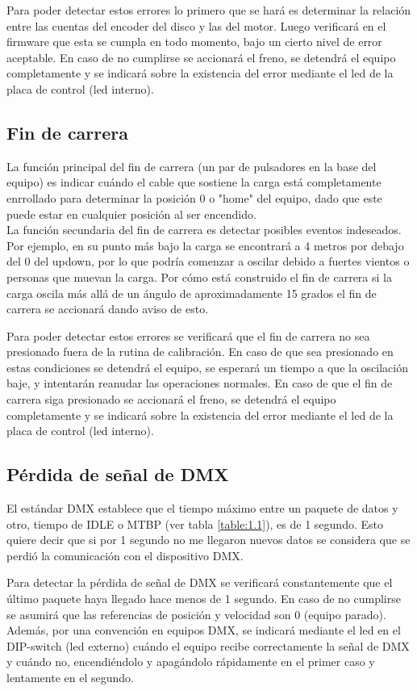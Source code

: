 Para poder detectar estos errores lo primero que se hará es determinar la relación entre las cuentas del encoder del disco y las del motor. Luego verificará en el firmware que esta se cumpla en todo momento, bajo un cierto nivel de error aceptable. En caso de no cumplirse se accionará el freno, se detendrá el equipo completamente y se indicará sobre la existencia del error mediante el led de la placa de control (led interno).

\subsection{Fin de carrera}
La función principal del fin de carrera (un par de pulsadores en la base del equipo) es indicar cuándo el cable que sostiene la carga está completamente enrrollado para determinar la posición 0 o "home" del equipo, dado que este puede estar en cualquier posición al ser encendido.\\
La función secundaria del fin de carrera es detectar posibles eventos indeseados. Por ejemplo, en su punto más bajo la carga se encontrará a 4 metros por debajo del 0 del updown, por lo que podría comenzar a oscilar debido a fuertes vientos o personas que muevan la carga. Por cómo está construido el fin de carrera si la carga oscila más allá de un ángulo de aproximadamente 15 grados el fin de carrera se accionará dando aviso de esto.

Para poder detectar estos errores se verificará que el fin de carrera no sea presionado fuera de la rutina de calibración. En caso de que sea presionado en estas condiciones se detendrá el equipo, se esperará un tiempo a que la oscilación baje, y intentarán reanudar las operaciones normales. En caso de que el fin de carrera siga presionado se accionará el freno, se detendrá el equipo completamente y se indicará sobre la existencia del error mediante el led de la placa de control (led interno).


\subsection{Pérdida de señal de DMX}
El estándar DMX establece que el tiempo máximo entre un paquete de datos y otro, tiempo de IDLE o MTBP (ver tabla \ref{table:1.1}), es de 1 segundo. Esto quiere decir que si por 1 segundo no me llegaron nuevos datos se considera que se perdió la comunicación con el dispositivo DMX.

Para detectar la pérdida de señal de DMX se verificará constantemente que el último paquete haya llegado hace menos de 1 segundo. En caso de no cumplirse se asumirá que las referencias de posición y velocidad son 0 (equipo parado). Además, por una convención en equipos DMX, se indicará mediante el led en el DIP-switch (led externo) cuándo el equipo recibe correctamente la señal de DMX y cuándo no, encendiéndolo y apagándolo rápidamente en el primer caso y lentamente en el segundo.


